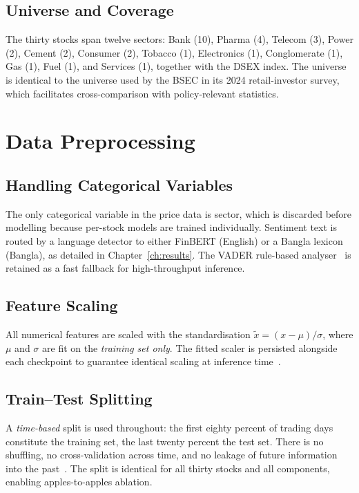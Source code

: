 \documentclass[12pt,a4paper,oneside]{report}
\begin{document}
\subsection{Universe and Coverage}

The thirty stocks span twelve sectors: Bank (10), Pharma (4),
Telecom (3), Power (2), Cement (2), Consumer (2), Tobacco (1),
Electronics (1), Conglomerate (1), Gas (1), Fuel (1), and
Services (1), together with the DSEX index. The universe is
identical to the universe used by the \ac{BSEC} in its 2024
retail-investor survey, which facilitates cross-comparison with
policy-relevant statistics.

\section{Data Preprocessing}

\subsection{Handling Categorical Variables}

The only categorical variable in the price data is sector, which is
discarded before modelling because per-stock models are trained
individually. Sentiment text is routed by a language detector to
either FinBERT (English) or a Bangla lexicon (Bangla), as
detailed in Chapter~\ref{ch:results}. The VADER rule-based
analyser~\cite{gu2021vader} is retained as a fast fallback for
high-throughput inference.

\subsection{Feature Scaling}

All numerical features are scaled with the standardisation
$\tilde x = (x - \mu)/\sigma$, where $\mu$ and $\sigma$ are fit
on the \emph{training set only}. The fitted scaler is persisted
alongside each checkpoint to guarantee identical scaling at
inference time~\cite{goodfellow2016deep}.

\subsection{Train--Test Splitting}

A \emph{time-based} split is used throughout: the first
eighty percent of trading days constitute the training set, the
last twenty percent the test set. There is no shuffling, no
cross-validation across time, and no leakage of future information
into the past~\cite{bailey2014stock}. The split is identical for
all thirty stocks and all components, enabling apples-to-apples
ablation.
\end{document}
